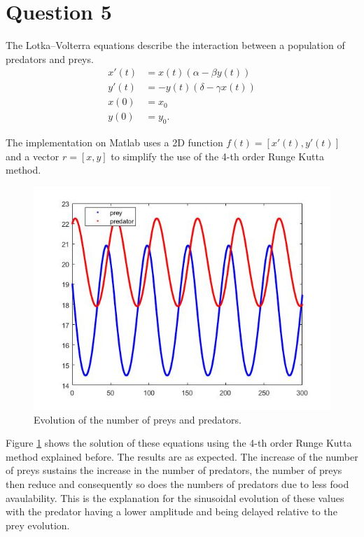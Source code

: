 \documentclass[a4paper, 11pt]{article}
\begin{document}
		\section*{Question 5}
		
			The Lotka–Volterra equations describe the interaction between a population of predators and preys.
			\begin{align}
				x'(t) &= x(t)(\alpha - \beta y(t)) \\
				y'(t) &= -y(t)(\delta - \gamma x(t))  \\
				x(0) &= x_0 \\
				y(0) &= y_0.
			\end{align}
			
			The implementation on Matlab uses a 2D function $f(t) = [x'(t), y'(t)]$ and a vector $r = [x,y]$ to simplify the use of the 4-th order Runge Kutta method.
			
			\begin{figure}[H]
				\centering
				\includegraphics[width=.6\linewidth]{ex5.jpg}
				\caption{Evolution of the number of preys and predators.}
				\label{fig:ex5}
			\end{figure}
			
			Figure \ref{fig:ex5} shows the solution of these equations using the 4-th order Runge Kutta method explained before.
			The results are as expected. 
			The increase of the number of preys sustains the increase in the number of predators, the number of preys then reduce and consequently so does the numbers of predators due to less food avaulability.
			This is the explanation for the sinusoidal evolution of these values with the predator having a lower amplitude and being delayed relative to the prey evolution.
	
\end{document}

